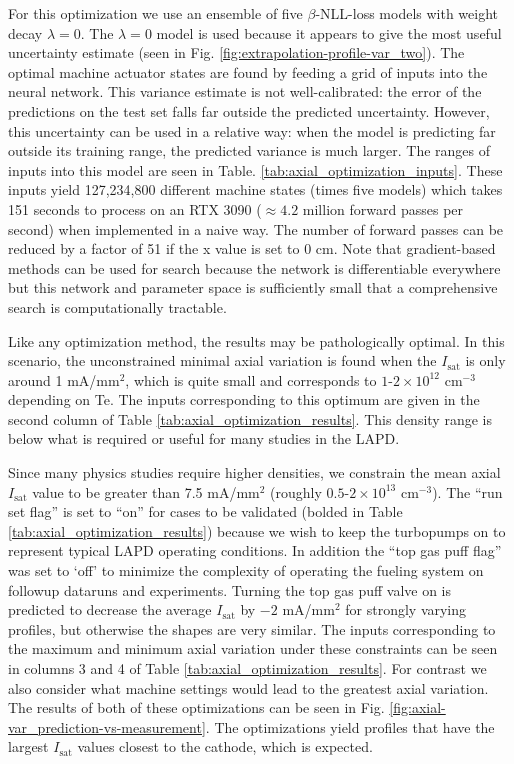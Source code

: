 For this optimization we use an ensemble of five $\beta$-NLL-loss models with weight decay $\lambda=0$. The $\lambda=0$ model is used because it appears to give the most useful uncertainty estimate (seen in Fig. \ref{fig:extrapolation-profile-var_two}). The optimal machine actuator states are found by feeding a grid of inputs into the neural network. This variance estimate is not well-calibrated: the error of the predictions on the test set falls far outside the predicted uncertainty. However, this uncertainty can be used in a relative way: when the model is predicting far outside its training range, the predicted variance is much larger. The ranges of inputs into this model are seen in Table. \ref{tab:axial_optimization_inputs}. These inputs yield 127,234,800 different machine states (times five models) which takes 151 seconds to process on an RTX 3090 ($\approx 4.2$ million forward passes per second) when implemented in a naive way. The number of forward passes can be reduced by a factor of 51 if the x value is set to 0 cm. Note that gradient-based methods can be used for search because the network is differentiable everywhere but this network and parameter space is sufficiently small that a comprehensive search is computationally tractable.

Like any optimization method, the results may be pathologically optimal. In this scenario, the unconstrained minimal axial variation is found when the $I_\text{sat}$ is only around 1 mA/mm$^2$, which is quite small and corresponds to $1\text{-}2\times 10^{12}$ cm$^{-3}$ depending on Te. The inputs corresponding to this optimum are given in the second column of Table \ref{tab:axial_optimization_results}. This density range is below what is required or useful for many studies in the LAPD. 

Since many physics studies require higher densities, we constrain the mean axial $I_\text{sat}$ value to be greater than 7.5 mA/mm$^{2}$ (roughly $0.5\text{-}2 \times 10^{13} \text{ cm}^{-3}$). The ``run set flag'' is set to ``on'' for cases to be validated (bolded in Table \ref{tab:axial_optimization_results}) because we wish to keep the turbopumps on to represent typical LAPD operating conditions. In addition the ``top gas puff flag'' was set to `off' to minimize the complexity of operating the fueling system on followup dataruns and experiments. Turning the top gas puff valve on is predicted to decrease the average $I_\text{sat}$ by $-2$ mA/mm$^2$ for strongly varying profiles, but otherwise the shapes are very similar.
The inputs corresponding to the maximum and minimum axial variation under these constraints can be seen in columns 3 and 4 of Table \ref{tab:axial_optimization_results}. For contrast we also consider what machine settings would lead to the greatest axial variation. The results of both of these optimizations can be seen in Fig. \ref{fig:axial-var_prediction-vs-measurement}. The optimizations yield profiles that have the largest $I_\text{sat}$ values closest to the cathode, which is expected.


